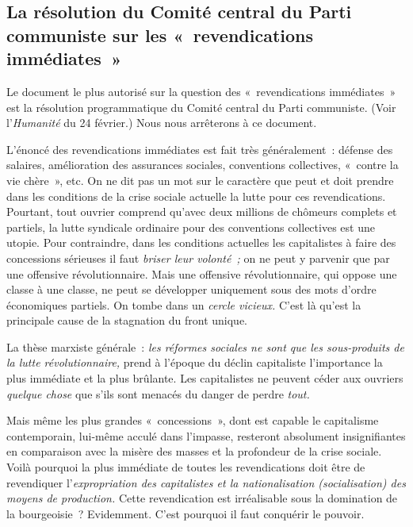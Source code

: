 \documentclass[french,twoside]{book} %
\begin{document}
\subsection[{La résolution du Comité central du Parti communiste sur les « revendications immédiates »}]{La résolution du Comité central du Parti communiste sur les « revendications immédiates »}
\noindent Le document le plus autorisé sur la question des « revendications immédiates » est la résolution programmatique du Comité central du Parti communiste. (Voir l’\emph{Humanité} du 24 février.) Nous nous arrêterons à ce document.\par
L’énoncé des revendications immédiates est fait très généralement : défense des salaires, amélioration des assurances sociales, conventions collectives, « contre la vie chère », etc. On ne dit pas un mot sur le caractère que peut et doit prendre dans les conditions de la crise sociale actuelle la lutte pour ces revendications. Pourtant, tout ouvrier comprend qu’avec deux millions de chômeurs complets et partiels, la lutte syndicale ordinaire pour des conventions collectives est une utopie. Pour contraindre, dans les conditions actuelles les capitalistes à faire des concessions  sérieuses il faut \emph{briser leur volonté ;} on ne peut y parvenir que par une offensive révolutionnaire. Mais une offensive révolutionnaire, qui oppose une classe à une classe, ne peut se développer uniquement sous des mots d’ordre économiques partiels. On tombe dans un \emph{cercle vicieux.} C’est là qu’est la principale cause de la stagnation du front unique.\par
La thèse marxiste générale : \emph{les réformes sociales ne sont que les sous-produits de la lutte révolutionnaire,} prend à l’époque du déclin capitaliste l’importance la plus immédiate et la plus brûlante. Les capitalistes ne peuvent céder aux ouvriers \emph{quelque chose} que s’ils sont menacés du danger de perdre \emph{tout.}\par
Mais même les plus grandes « concessions », dont est capable le capitalisme contemporain, lui-même acculé dans l’impasse, resteront absolument insignifiantes en comparaison avec la misère des masses et la profondeur de la crise sociale. Voilà pourquoi la plus immédiate de toutes les revendications doit être de revendiquer l’\emph{expropriation des capitalistes et la nationalisation (socialisation) des moyens de production.} Cette revendication est irréalisable sous la domination de la bourgeoisie ? Evidemment. C’est pourquoi il faut conquérir le pouvoir.
\end{document}
